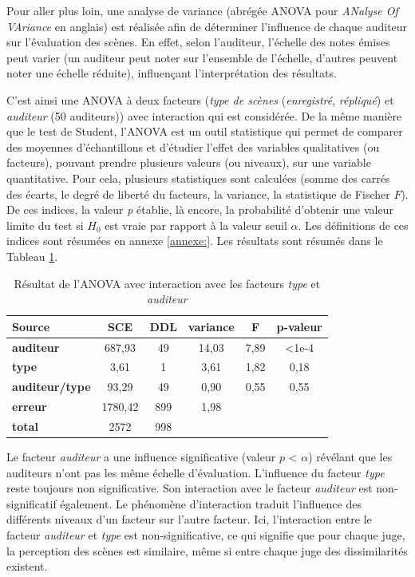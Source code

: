 Pour aller plus loin, une analyse de variance (abrégée ANOVA pour \textit{ANalyse Of VAriance} en anglais) est réalisée afin de déterminer l'influence de chaque auditeur sur l'évaluation des scènes. En effet, selon l'auditeur, l'échelle des notes émises peut varier (un auditeur peut noter sur l'ensemble de l'échelle, d'autres peuvent noter une échelle réduite), influençant l'interprétation des résultats.

C'est ainsi une ANOVA à deux facteurs (\textit{type de scènes} (\textit{enregistré}, \textit{répliqué}) et \textit{auditeur} (50 auditeurs)) avec interaction qui est considérée. De la même manière que le test de Student, l'ANOVA est un outil statistique qui permet de comparer des moyennes d'échantillons et d'étudier l'effet des variables qualitatives (ou facteurs), pouvant prendre plusieurs valeurs (ou niveaux), sur une variable quantitative.
Pour cela, plusieurs statistiques sont calculées (somme des carrés des écarts, le degré de liberté du facteurs, la variance, la statistique de Fischer $F$). De ces indices, la valeur \textit{p} établie, là encore, la probabilité d'obtenir une valeur limite du test si $H_0$ est vraie par rapport à la valeur seuil $\alpha$. Les définitions de ces indices sont résumées en annexe \ref{annexe:}. Les résultats sont résumés dans le Tableau \ref{tab:anova_auditeur}.

\begin{table}[ht]
\centering
\begin{tabular}{lccccc}
\hline
\textbf{Source}     & \textbf{SCE} & \textbf{DDL} & \textbf{variance} & \textbf{F} & \textbf{p-valeur} \\
\hline
\textbf{auditeur} & 687,93 & 49 & 14,03 & 7,89 & <1e-4 \\
\hline
\textbf{type} & 3,61 & 1 & 3,61 & 1,82 & 0,18 \\
\hline
\textbf{auditeur/type} & 93,29 & 49 & 0,90 & 0,55 & 0,55 \\
\hline
\textbf{erreur}      & 1780,42 & 899 & 1,98 & &  \\
\hline
\textbf{total}      & 2572 & 998 & & & \\
\hline
\end{tabular}
\caption{Résultat de l'ANOVA avec interaction avec les facteurs \textit{type} et \textit{auditeur}}
\label{tab:anova_auditeur}
\end{table}

Le facteur \textit{auditeur} a une influence significative (valeur $p$ < $\alpha$) révélant que les auditeurs n'ont pas les même échelle d'évaluation. L'influence du facteur \textit{type} reste toujours non significative. Son interaction avec le facteur \textit{auditeur} est non-significatif également.
Le phénomène d'interaction traduit l'influence des différents niveaux d'un facteur sur l'autre facteur. Ici, l'interaction entre le facteur \textit{auditeur} et \textit{type} est non-significative, ce qui signifie que pour chaque juge, la perception des scènes est similaire, même si entre chaque juge des dissimilarités existent.

